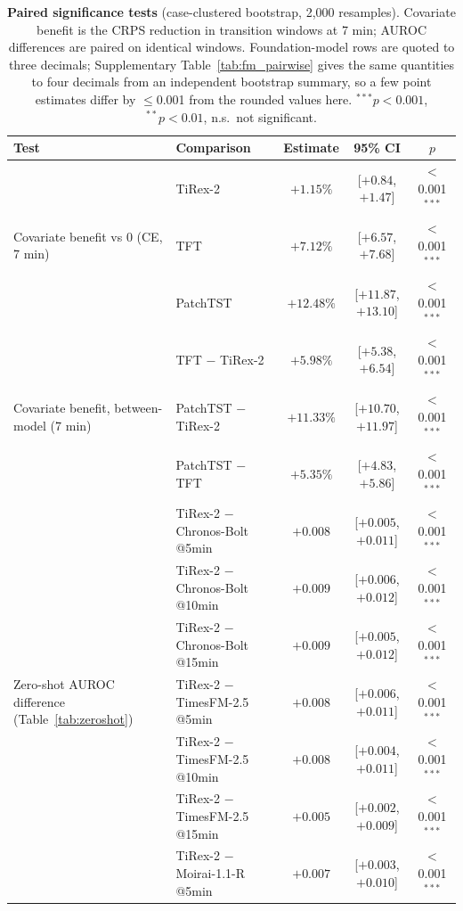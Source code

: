 \begin{table}[t]
\centering\footnotesize
\caption{\textbf{Paired significance tests} (case-clustered bootstrap, 2{,}000 resamples). Covariate benefit is the CRPS reduction in transition windows at 7 min; AUROC differences are paired on identical windows. Foundation-model rows are quoted to three decimals; Supplementary Table~\ref{tab:fm_pairwise} gives the same quantities to four decimals from an independent bootstrap summary, so a few point estimates differ by $\leq$0.001 from the rounded values here. $^{***}p<0.001$, $^{**}p<0.01$, n.s.\ not significant.}
\label{tab:stats}
\begin{tabular}{p{3cm}lccc}
\toprule
Test & Comparison & Estimate & 95\% CI & $p$ \\
\midrule
\multirow{3}{2.9cm}{\raggedright Covariate benefit vs 0 (CE, 7 min)}
 & TiRex-2   & $+1.15\%$  & [$+0.84$, $+1.47$]   & $<$0.001$^{***}$ \\
 & TFT       & $+7.12\%$  & [$+6.57$, $+7.68$]   & $<$0.001$^{***}$ \\
 & PatchTST  & $+12.48\%$ & [$+11.87$, $+13.10$] & $<$0.001$^{***}$ \\
\midrule
\multirow{3}{2.9cm}{\raggedright Covariate benefit, between-model (7 min)}
 & TFT $-$ TiRex-2      & $+5.98\%$  & [$+5.38$, $+6.54$]   & $<$0.001$^{***}$ \\
 & PatchTST $-$ TiRex-2 & $+11.33\%$ & [$+10.70$, $+11.97$] & $<$0.001$^{***}$ \\
 & PatchTST $-$ TFT     & $+5.35\%$  & [$+4.83$, $+5.86$]   & $<$0.001$^{***}$ \\
\midrule
\multirow{9}{2.9cm}{\raggedright Zero-shot AUROC difference (Table~\ref{tab:zeroshot})}
 & TiRex-2 $-$ Chronos-Bolt @5min  & $+0.008$ & [$+0.005$, $+0.011$] & $<$0.001$^{***}$ \\
 & TiRex-2 $-$ Chronos-Bolt @10min & $+0.009$ & [$+0.006$, $+0.012$] & $<$0.001$^{***}$ \\
 & TiRex-2 $-$ Chronos-Bolt @15min & $+0.009$ & [$+0.005$, $+0.012$] & $<$0.001$^{***}$ \\
 & TiRex-2 $-$ TimesFM-2.5 @5min   & $+0.008$ & [$+0.006$, $+0.011$] & $<$0.001$^{***}$ \\
 & TiRex-2 $-$ TimesFM-2.5 @10min  & $+0.008$ & [$+0.004$, $+0.011$] & $<$0.001$^{***}$ \\
 & TiRex-2 $-$ TimesFM-2.5 @15min  & $+0.005$ & [$+0.002$, $+0.009$] & $<$0.001$^{***}$ \\
 & TiRex-2 $-$ Moirai-1.1-R @5min  & $+0.007$ & [$+0.003$, $+0.010$] & $<$0.001$^{***}$ \\

\end{tabular}
\end{table}
